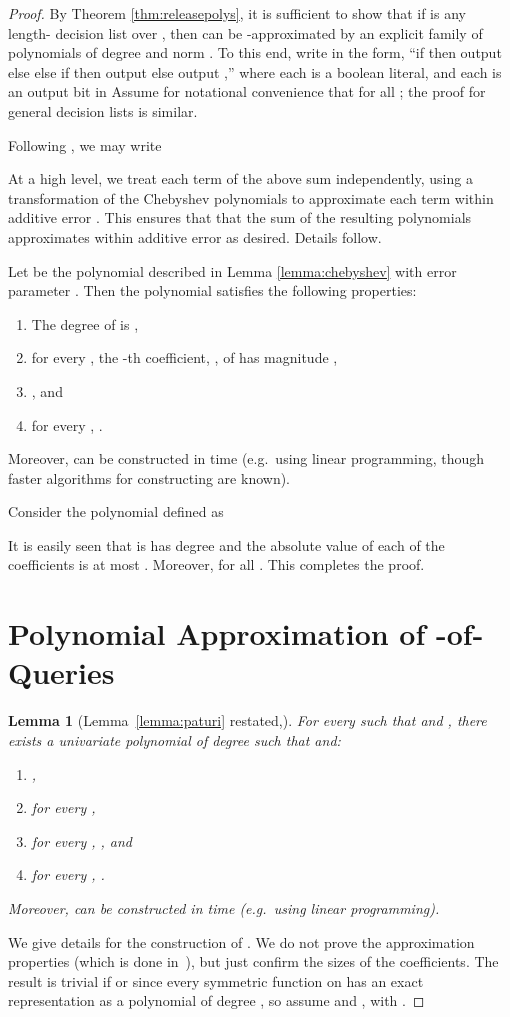 \documentclass[11pt]{article}
\newtheorem{lemma}[theorem]{Lemma}
\theoremstyle{definition}
\begin{document}
\begin{proof} By Theorem \ref{thm:releasepolys}, it is sufficient to show that if  is any length- decision list over , then  can be -approximated 
by an explicit family of polynomials of degree  and norm . To this end, write  in the form,
``if  then output  else  else if 
then output  else output ,'' where each
 is a boolean literal, and each  is an output
bit in  Assume for notational convenience that  for all ; the proof for general decision lists is similar.

Following \cite[Theorem 8]{KlivansSe04}, we may write


At a high level, we treat each term of the above sum independently, using a transformation of the Chebyshev polynomials to approximate each term
within additive error . This ensures that 
that the sum of the resulting polynomials approximates
 within additive error  as desired. Details follow.

Let  be the polynomial described in Lemma \ref{lemma:chebyshev} with error parameter . Then the polynomial  satisfies the following properties:

\begin{enumerate}
\item The degree of  is ,
\item  for every , the -th coefficient, , of  has magnitude ,
\item  , and
\item for every , .
\end{enumerate}
Moreover,  can be constructed in time  (e.g.~using linear programming, though faster algorithms for constructing  are known).

Consider the polynomial  defined as 



It is easily seen that  is has degree  and the absolute value of each of the coefficients is at most . Moreover,  for all . This completes the proof.

\section{Polynomial Approximation of -of- Queries}
\label{sherstovapp}
\begin{lemma}[Lemma~\ref{lemma:paturi} restated,\cite{Sherstov09}]
For every  such that  and , there exists a univariate polynomial  of degree  such that  and:
\begin{enumerate}
\item  ,
\item for every ,
\item for every , , and
\item for every , .
\end{enumerate}
Moreover,  can be constructed in time  (e.g.~using linear programming).
\end{lemma}
We give details for the construction of \cite[Lemma 3.11]{Sherstov09}. We do not prove the approximation properties (which is done in~\cite{Sherstov09}), but just confirm the sizes of the coefficients.  
The result is trivial if  or  since every symmetric function on 
has an exact representation as a polynomial of degree , so assume  and , with . 




\end{proof}
\end{document}
